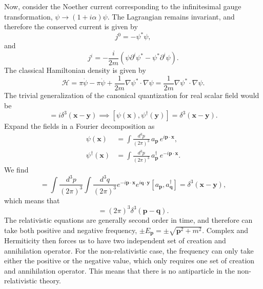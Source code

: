 \begin{solution}
\begin{equation}
    \end{equation}
    Now, consider the Noether current corresponding to the infinitesimal gauge transformation, $\psi\to(1+i\alpha)\psi$. The Lagrangian remains invariant, and therefore the conserved current is given by
    \begin{equation}
        j^0 = -\psi^*\psi,
    \end{equation}
    and
    \begin{equation}
        j^i = -\frac{i}{2m}(\psi\partial^i\psi^* - \psi^*\partial^i\psi).
    \end{equation}
    The classical Hamiltonian density is given by
    \begin{equation}
        \mathcal{H} = \pi\dot{\psi}-\pi\dot{\psi} +\frac{1}{2m}\nabla\psi^*\cdot\nabla\psi = \frac{1}{2m}\nabla\psi^*\cdot\nabla\psi.
    \end{equation}
    The trivial generalization of the canonical quantization for real scalar field would be
    \begin{equation}
        [\psi(\mathbf{x}),\pi(\mathbf{y})] = i\delta^3(\mathbf{x}-\mathbf{y}) \implies [\psi(\mathbf{x}),\psi^\dagger(\mathbf{y})] = \delta^3(\mathbf{x}-\mathbf{y}).
    \end{equation}
    Expand the fields in a Fourier decomposition as
    \begin{align}
        \psi(\mathbf{x}) &= \int\frac{d^3p}{(2\pi)^3}\,a_{\mathbf{p}}\,e^{i\mathbf{p}\cdot\mathbf{x}},\\
        \psi^\dagger(\mathbf{x}) &= \int\frac{d^3p}{(2\pi)^3}\,a_{\mathbf{p}}^\dagger\,e^{-i\mathbf{p}\cdot\mathbf{x}}.
    \end{align}
    We find
    \begin{equation}
        [\psi(\mathbf{x}),\pi(\mathbf{y})] =\int\frac{d^3p}{(2\pi)^3}\int\frac{d^3q}{(2\pi)^3}e^{-i\mathbf{p}\cdot\mathbf{x}}e^{i\mathbf{q}\cdot\mathbf{y}}[a_\mathbf{p},a_\mathbf{q}^\dagger] = \delta^3(\mathbf{x}-\mathbf{y}),
    \end{equation}
    which means that 
    \begin{equation}
        [a_\mathbf{p},a_\mathbf{q}^\dagger] = (2\pi)^3\delta^3(\mathbf{p}-\mathbf{q}).
    \end{equation}
    The relativistic equations are generally second order in time, and therefore can take both positive and negative frequency, $\pm E_\mathbf{p} = \pm\sqrt{\mathbf{p}^2+m^2}$. Complex and Hermiticity then forces us to have two independent set of creation and annihilation operator. For the non-relativistic case, the frequency can only take either the positive or the negative value, which only requires one set of creation and annihilation operator. This means that there is no antiparticle in the non-relativistic theory.


\end{solution}
